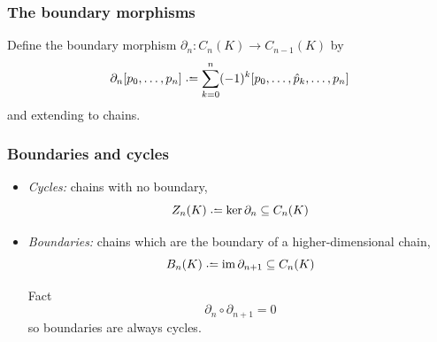 \documentclass{beamer}
\begin{document}
\begin{frame}
	\frametitle{The boundary morphisms}
	Define the boundary morphism \( \partial_n \colon C_n(K) \to C_{n-1}(K) \) by
	\begin{equation*}
		\partial_n [p_0, \dots, p_n] \defeq \sum_{k = 0}^{n} (-1)^k [p_0, \dots, \hat p_k,
		\dots, p_n]
	\end{equation*}
	and extending to chains. 
	\pause

\end{frame}	

\begin{frame}
	\frametitle{Boundaries and cycles}
	\begin{itemize}
		\item \emph{Cycles:} chains with no boundary,
			\begin{equation*}
				Z_n(K) \defeq \ker{\partial_n} \subseteq C_n(K)
			\end{equation*}
			\pause

		\item \emph{Boundaries:} chains which are the boundary of a higher-dimensional chain,
			\begin{equation*}
				B_n(K) \defeq \im{\partial_{n+1}} \subseteq C_n(K)
			\end{equation*}
		\pause

		\begin{block}{Fact}
			\begin{equation*}
				\partial_n \circ \partial_{n+1} = 0
			\end{equation*}
			so boundaries are always cycles. 
		\end{block}
			
	\end{itemize}
\end{frame}
\end{document}
